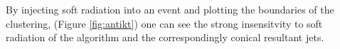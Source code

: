 By injecting soft radiation into an event and plotting the boundaries of the clustering, (Figure \ref{fig:antikt}) one 
can see the strong insensitvity to soft radiation of the algorithm and the correspondingly conical resultant jets.





